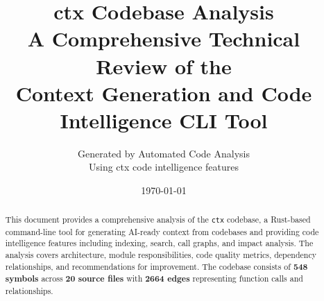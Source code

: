 \documentclass[11pt,a4paper]{article}
\title{%
    \vspace{-1cm}
    \Huge\textbf{ctx Codebase Analysis}\\[0.5cm]
    \Large A Comprehensive Technical Review of the\\
    Context Generation and Code Intelligence CLI Tool
}
\author{%
    Generated by Automated Code Analysis\\[0.2cm]
    \small Using ctx code intelligence features
}
\date{\today}
\newcommand{\ctx}{\texttt{ctx}}
\begin{document}
\maketitle

\begin{abstract}
This document provides a comprehensive analysis of the \ctx{} codebase, a Rust-based command-line tool for generating AI-ready context from codebases and providing code intelligence features including indexing, search, call graphs, and impact analysis. The analysis covers architecture, module responsibilities, code quality metrics, dependency relationships, and recommendations for improvement. The codebase consists of \textbf{548 symbols} across \textbf{20 source files} with \textbf{2664 edges} representing function calls and relationships.
\end{abstract}

\tableofcontents
\newpage











\end{document}
